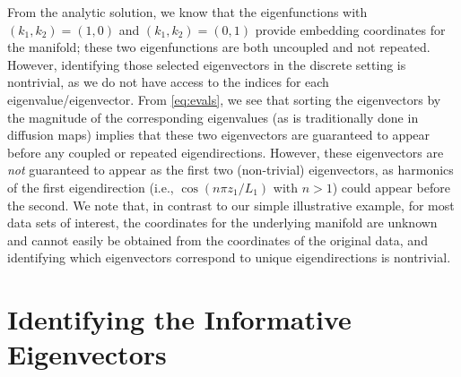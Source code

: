 From the analytic solution, we know that the eigenfunctions with $(k_1, k_2) =(1, 0)$ and $(k_1, k_2) =(0, 1)$ provide embedding coordinates for the manifold; these two eigenfunctions are both uncoupled and not repeated.
%
However, identifying those selected eigenvectors in the discrete setting is nontrivial, as we do not have access to the indices for each eigenvalue/eigenvector.
%
From \eqref{eq:evals}, we see that sorting the eigenvectors by the magnitude of the corresponding eigenvalues (as is traditionally done in diffusion maps) implies that these two eigenvectors are guaranteed to appear before any coupled or repeated eigendirections.
%
However, these eigenvectors are {\em not} guaranteed to appear as the first two (non-trivial) eigenvectors, as harmonics of the first eigendirection (i.e., $\cos \left( n \pi z_1 / L_1 \right)$ with $n > 1$) could appear before the second.
%
We note that, in contrast to our simple illustrative example, for most data sets of interest, the coordinates for the underlying manifold are unknown and cannot easily be obtained from the coordinates of the original data, and identifying which eigenvectors correspond to unique eigendirections is nontrivial.

\section{Identifying the Informative Eigenvectors }

